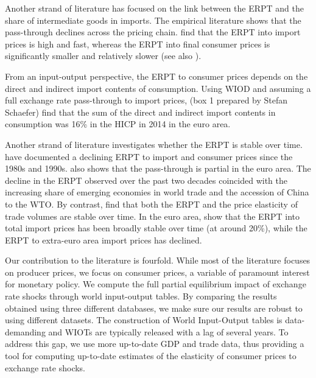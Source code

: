\documentclass[11pt,a4paper]{article}
\begin{document}
Another strand of literature has focused on the link between the ERPT and the share of intermediate goods in imports. 
The empirical literature shows that the pass-through declines across the pricing chain. \cite{Ortega2020} find that the ERPT into import prices is high and fast, whereas the ERPT into final consumer prices is significantly smaller and relatively slower (see also \cite{Hahn2003, Kunovac2017, BenCheikh2017}).

From an input-output perspective, the ERPT to consumer prices depends on the direct and indirect import contents of consumption. Using WIOD and assuming a full exchange rate pass-through to import prices, \cite{Ortega2020}{ (box 1 prepared by Stefan Schaefer)} find that the sum of the direct and indirect import contents in consumption was 16\% in the HICP in 2014 in the euro area.

Another strand of literature investigates whether the ERPT is stable over time. \cite{Campa2008} have documented a declining ERPT to import and consumer prices since the 1980s and 1990s. \cite{Ozyurt2016} also shows that the pass-through is partial in the euro area. The decline in the ERPT observed over the past two decades coincided with the increasing share of emerging economies in world trade and the accession of China to the WTO. By contrast, \cite{Leigh2017} find that both the ERPT and the price elasticity of trade volumes are stable over time. In the euro area, \cite{Ortega2020} show that the ERPT into total import prices has been broadly stable over time (at around 20\%), while the ERPT to extra-euro area import prices has declined.

Our contribution to the literature is fourfold. 
While most of the literature focuses on producer prices, we focus on consumer prices, a variable of paramount interest for monetary policy. 
We compute the full partial equilibrium impact of exchange rate shocks through world input-output tables. 
By comparing the results obtained using three different databases, we make sure our results are robust to using different datasets. 
The construction of World Input-Output tables is data-demanding and WIOTs are typically released with a lag of several years. 
To address this gap, we use more up-to-date GDP and trade data, thus providing a tool for computing up-to-date estimates of the elasticity of consumer prices to exchange rate shocks.
\end{document}
